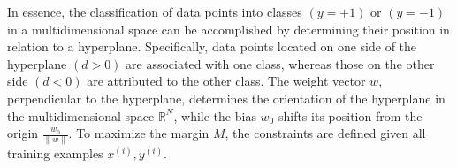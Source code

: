 In essence, the classification of data points into classes $(y = +1)$ or $(y = -1)$ in a multidimensional space can be accomplished by determining their position in relation to a hyperplane. Specifically, data points located on one side of the hyperplane $(d > 0)$ are associated with one class, whereas those on the other side $(d < 0)$ are attributed to the other class. The weight vector $w$, perpendicular to the hyperplane, determines the orientation of the hyperplane in the multidimensional space $\mathbb{R}^N$, while the bias $w_0$ shifts its position from the origin $\frac{w_0}{\parallel w \parallel}$. To maximize the margin $M$, the %
constraints are defined given all training examples {$x^{(i)}, y^{(i)}$}.








